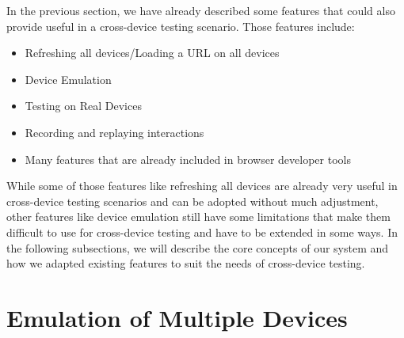 In the previous section, we have already described some features that could also provide useful in a cross-device testing scenario. Those features include:
\begin{itemize}
	\item Refreshing all devices/Loading a URL on all devices
	\item Device Emulation
	\item Testing on Real Devices
	\item Recording and replaying interactions
	\item Many features that are already included in browser developer tools
\end{itemize}

While some of those features like refreshing all devices are already very useful in cross-device testing scenarios and can be adopted without much adjustment, other features like device emulation still have some limitations that make them difficult to use for cross-device testing and have to be extended in some ways. In the following subsections, we will describe the core concepts of our system and how we adapted existing features to suit the needs of cross-device testing.

\section{Emulation of Multiple Devices}

